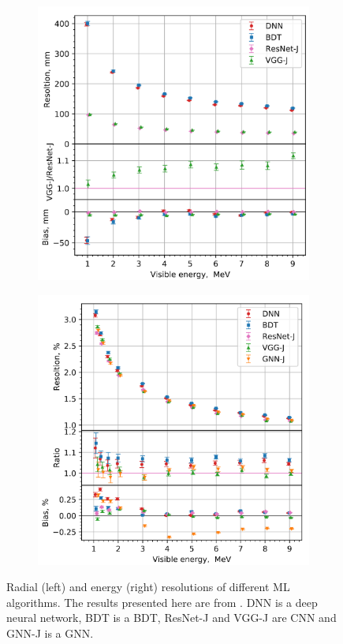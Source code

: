 \begin{figure}[ht]
  \centering
  \begin{subfigure}{0.48\linewidth}
    \centering
    \includegraphics[width=\linewidth]{images/juno/reco/ml_vertex.png}
  \end{subfigure}
  \hfill
  \begin{subfigure}{0.48\linewidth}
    \centering
    \includegraphics[width=\linewidth]{images/juno/reco/ml_energy.png}
  \end{subfigure}
  \caption{Radial (left) and energy (right) resolutions of different ML algorithms. The results presented here are from \cite{qian_vertex_2021}. DNN is a deep neural network, BDT is a BDT, ResNet-J and VGG-J are CNN and GNN-J is a GNN.}
  \label{fig:juno:rec:ml_res}
\end{figure}

